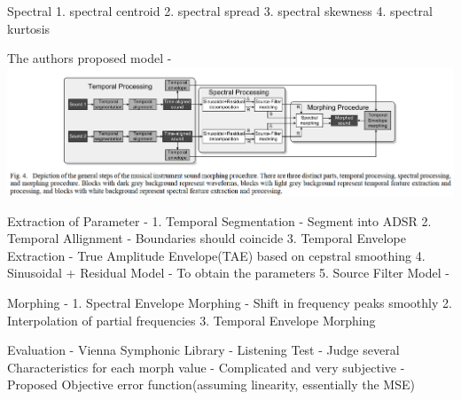 \documentclass[11pt]{article}
\makeatletter
\def\maxwidth{\ifdim\Gin@nat@width>\linewidth\linewidth
    \else\Gin@nat@width\fi}
\let\Oldincludegraphics\includegraphics
\renewcommand{\includegraphics}[1]{\Oldincludegraphics[width=.8\maxwidth]{#1}}
\makeatother
\begin{document}
Spectral 1. spectral centroid 2. spectral spread 3. spectral skewness 4.
spectral kurtosis

The authors proposed model - \includegraphics{fig_11.PNG}

    Extraction of Parameter - 1. Temporal Segmentation - Segment into ADSR
2. Temporal Allignment - Boundaries should coincide 3. Temporal Envelope
Extraction - True Amplitude Envelope(TAE) based on cepstral smoothing 4.
Sinusoidal + Residual Model - To obtain the parameters 5. Source Filter
Model -

Morphing - 1. Spectral Envelope Morphing - Shift in frequency peaks
smoothly 2. Interpolation of partial frequencies 3. Temporal Envelope
Morphing

    Evaluation - Vienna Symphonic Library - Listening Test - Judge several
Characteristics for each morph value - Complicated and very subjective -
Proposed Objective error function(assuming linearity, essentially the
MSE)


    
    
    
    
\end{document}
